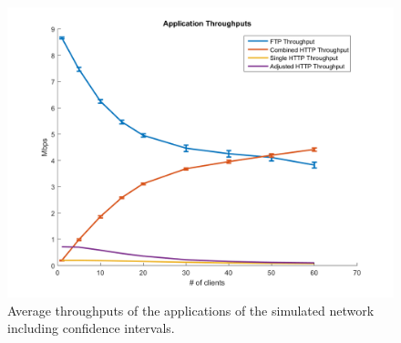 \documentclass[
10pt, %
a4paper, %
oneside, %
headinclude,footinclude, %
BCOR5mm, %
]{scrartcl}
\begin{document}
\begin{figure}[!ht]
  \centering
  \includegraphics[width=\textwidth]{Figures/cctv_application_throughputs_all.png}
  \caption{Average throughputs of the applications of the simulated network including confidence intervals.} \label{fig:cctv_app_throughput_all}
\end{figure}
\end{document}
